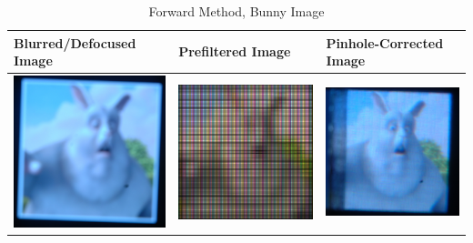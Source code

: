 \begin{table}
     \caption {Forward Method, Bunny Image}
    \begin{tabular}{| l | l | l |}
    \hline Blurred/Defocused Image & Prefiltered Image & Pinhole-Corrected Image \\ \hline
      \includegraphics[width=1.9in]{chapters/chapter5/images/Shichao_Bunny_380_250_Origin.JPG} &
      \includegraphics[width=1.9in]{chapters/chapter5/images/Shichao_Bunny_Prefiltered.png} &
      \includegraphics[width=1.9in]{chapters/chapter5/images/Shichao_Bunny_380_250_Pinhole.JPG} \\ \hline
    \end{tabular}
\end{table}
 	 	 
